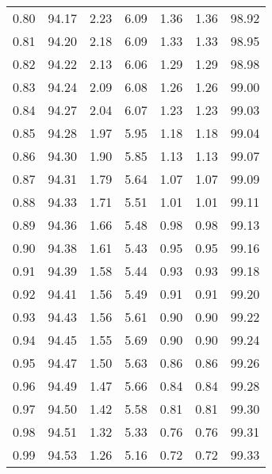 \begin{tabular}{|c|c|c|c|c|c|c|}
      0.80 &     94.17 &      2.23 &       6.09 &    1.36 &       1.36 &         98.92 \\
      0.81 &     94.20 &      2.18 &       6.09 &    1.33 &       1.33 &         98.95 \\
      0.82 &     94.22 &      2.13 &       6.06 &    1.29 &       1.29 &         98.98 \\
      0.83 &     94.24 &      2.09 &       6.08 &    1.26 &       1.26 &         99.00 \\
      0.84 &     94.27 &      2.04 &       6.07 &    1.23 &       1.23 &         99.03 \\
      0.85 &     94.28 &      1.97 &       5.95 &    1.18 &       1.18 &         99.04 \\
      0.86 &     94.30 &      1.90 &       5.85 &    1.13 &       1.13 &         99.07 \\
      0.87 &     94.31 &      1.79 &       5.64 &    1.07 &       1.07 &         99.09 \\
      0.88 &     94.33 &      1.71 &       5.51 &    1.01 &       1.01 &         99.11 \\
      0.89 &     94.36 &      1.66 &       5.48 &    0.98 &       0.98 &         99.13 \\
      0.90 &     94.38 &      1.61 &       5.43 &    0.95 &       0.95 &         99.16 \\
      0.91 &     94.39 &      1.58 &       5.44 &    0.93 &       0.93 &         99.18 \\
      0.92 &     94.41 &      1.56 &       5.49 &    0.91 &       0.91 &         99.20 \\
      0.93 &     94.43 &      1.56 &       5.61 &    0.90 &       0.90 &         99.22 \\
      0.94 &     94.45 &      1.55 &       5.69 &    0.90 &       0.90 &         99.24 \\
      0.95 &     94.47 &      1.50 &       5.63 &    0.86 &       0.86 &         99.26 \\
      0.96 &     94.49 &      1.47 &       5.66 &    0.84 &       0.84 &         99.28 \\
      0.97 &     94.50 &      1.42 &       5.58 &    0.81 &       0.81 &         99.30 \\
      0.98 &     94.51 &      1.32 &       5.33 &    0.76 &       0.76 &         99.31 \\
      0.99 &     94.53 &      1.26 &       5.16 &    0.72 &       0.72 &         99.33 \\
\bottomrule
\end{tabular}
